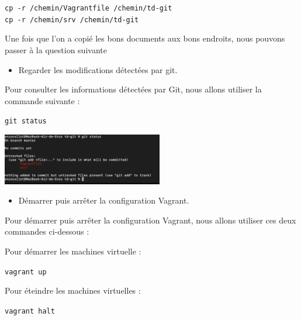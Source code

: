 \documentclass[12pt]{article}
\begin{document}
\texttt{cp -r /chemin/Vagrantfile /chemin/td-git} \\
\texttt{cp -r /chemin/srv /chemin/td-git}

\vspace{0.3cm}

Une fois que l'on a copié les bons documents aux bons endroits, nous pouvons passer à la question suivante 

\vspace{0.3cm}

\begin{itemize}
  \item Regarder les modifications détectées par git.
\end{itemize}

\vspace{0.3cm}

Pour consulter les informations détectées par Git, nous allons utiliser la commande suivante :

\texttt{git status}

\vspace{0.3cm}

\begin{center}
  \includegraphics[width=7cm]{Image-TD-Git-1/git-status.png}
\end{center}

\vspace{0.3cm}

\begin{itemize}
  \item Démarrer puis arrêter la configuration Vagrant.
\end{itemize}

Pour démarrer puis arrêter la configuration Vagrant, nous allons utiliser ces deux commandes ci-dessous : \newline

Pour démarrer les machines virtuelle : 

\texttt{vagrant up}

Pour éteindre les machines virtuelles : 

\texttt{vagrant halt}

\vspace{0.3cm}

\newpage
\end{document}
